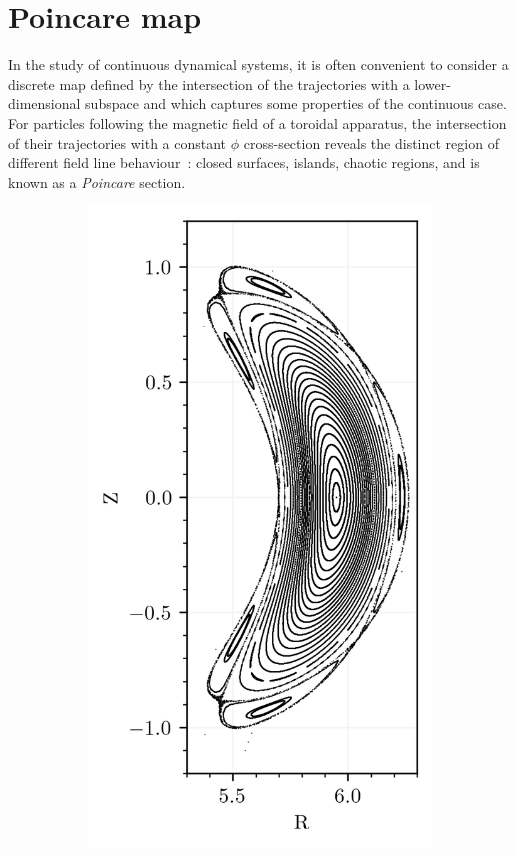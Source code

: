 \chapter{Poincare map}\label{sec:pmap}

In the study of continuous dynamical systems, it is often convenient to consider a discrete map defined by the intersection of the trajectories with a lower-dimensional subspace and which captures some properties of the continuous case. For particles following the magnetic field of a toroidal apparatus, the intersection of their trajectories with a constant $\phi$ cross-section reveals the distinct region of different field line behaviour~: closed surfaces, islands, chaotic regions, and is known as a \textit{Poincare} section.

\begin{figure}[H]
    \centering
    \begin{subfigure}[c]{0.32\textwidth}
        \centering
        \includegraphics[width=\textwidth]{images/theory/w7x.png}

\end{subfigure}
\end{figure}
